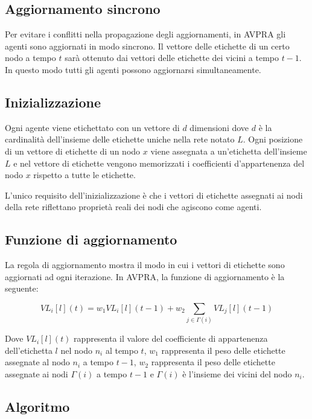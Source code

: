 \documentclass[a4paper,12pt]{report}
\begin{document}
		\subsection{Aggiornamento sincrono}
		Per evitare i conflitti nella propagazione degli aggiornamenti, in AVPRA gli agenti sono aggiornati in modo sincrono. Il vettore delle etichette di un certo nodo a tempo $t$ sarà ottenuto dai vettori delle etichette dei vicini a tempo $t-1$. In questo modo tutti gli agenti possono aggiornarsi simultaneamente. \cite{avpra}
	
		\subsection{Inizializzazione}
		Ogni agente viene etichettato con un vettore di $d$ dimensioni dove $d$ è la cardinalità dell'insieme delle etichette uniche nella rete notato $L$. Ogni posizione di un vettore di etichette di un nodo $x$ viene assegnata a un'etichetta dell'insieme $L$ e nel vettore di etichette vengono memorizzati i coefficienti d'appartenenza del nodo $x$ rispetto a tutte le etichette. 
		
		L'unico requisito dell'inizializzazione è che i vettori di etichette assegnati ai nodi della rete riflettano proprietà reali dei nodi che agiscono come agenti. \cite{avpra}

		\subsection{Funzione di aggiornamento}
		La regola di aggiornamento mostra il modo in cui i vettori di etichette sono aggiornati ad ogni iterazione. In AVPRA, la funzione di aggiornamento è la seguente:
		
		\begin{equation}
		VL_i [l] (t) = w_1 VL_i [l] (t-1) + w_2 \sum_{j \in \Gamma(i)} VL_j [l](t-1)
		\end{equation}

		Dove $VL_i[l](t)$ rappresenta il valore del coefficiente di appartenenza dell'etichetta $l$ nel nodo $n_i$ al tempo $t$, $w_1$ rappresenta il peso delle etichette assegnate al nodo $n_i$ a tempo $t - 1$, $w_2$ rappresenta il peso delle etichette assegnate ai nodi $\Gamma(i)$ a tempo $t - 1$ e $\Gamma(i)$ è l'insieme dei vicini del nodo $n_i$. \cite{avpra}

		\subsection{Algoritmo}
		
\end{document}
